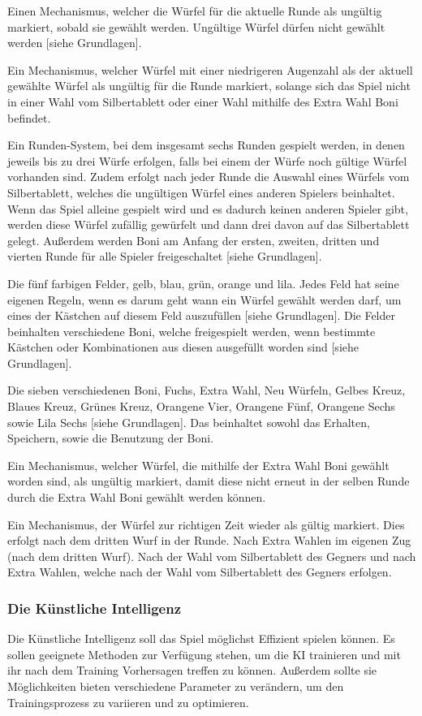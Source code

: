 Einen Mechanismus, welcher die Würfel für die aktuelle Runde als ungültig markiert, sobald sie gewählt werden. Ungültige Würfel dürfen nicht gewählt werden [siehe Grundlagen].

Ein Mechanismus, welcher Würfel mit einer niedrigeren Augenzahl als der aktuell gewählte Würfel als ungültig für die Runde markiert, solange sich das Spiel nicht in einer Wahl vom Silbertablett oder einer Wahl mithilfe des Extra Wahl Boni befindet.

Ein Runden-System, bei dem insgesamt sechs Runden gespielt werden, in denen jeweils bis zu drei Würfe erfolgen, falls bei einem der Würfe noch gültige Würfel vorhanden sind. Zudem erfolgt nach jeder Runde die Auswahl eines Würfels vom Silbertablett, welches die ungültigen Würfel eines anderen Spielers beinhaltet. Wenn das Spiel alleine gespielt wird und es dadurch keinen anderen Spieler gibt, werden diese Würfel zufällig gewürfelt und dann drei davon auf das Silbertablett gelegt. Außerdem werden Boni am Anfang der ersten, zweiten, dritten und vierten Runde für alle Spieler freigeschaltet [siehe Grundlagen].

Die fünf farbigen Felder, gelb, blau, grün, orange und lila. Jedes Feld hat seine eigenen Regeln, wenn es darum geht wann ein Würfel gewählt werden darf, um eines der Kästchen auf diesem Feld auszufüllen [siehe Grundlagen]. Die Felder beinhalten verschiedene Boni, welche freigespielt werden, wenn bestimmte Kästchen oder Kombinationen aus diesen ausgefüllt worden sind [siehe Grundlagen].

Die sieben verschiedenen Boni, Fuchs, Extra Wahl, Neu Würfeln, Gelbes Kreuz, Blaues Kreuz, Grünes Kreuz, Orangene Vier, Orangene Fünf, Orangene Sechs sowie Lila Sechs [siehe Grundlagen]. Das beinhaltet sowohl das Erhalten, Speichern, sowie die Benutzung der Boni.

Ein Mechanismus, welcher Würfel, die mithilfe der Extra Wahl Boni gewählt worden sind, als ungültig markiert, damit diese nicht erneut in der selben Runde durch die Extra Wahl Boni gewählt werden können.

Ein Mechanismus, der Würfel zur richtigen Zeit wieder als gültig markiert. Dies erfolgt nach dem dritten Wurf in der Runde. Nach Extra Wahlen im eigenen Zug (nach dem dritten Wurf). Nach der Wahl vom Silbertablett des Gegners und nach Extra Wahlen, welche nach der Wahl vom Silbertablett des Gegners erfolgen.
\subsubsection{Die Künstliche Intelligenz}
Die Künstliche Intelligenz soll das Spiel möglichst Effizient spielen können. Es sollen geeignete Methoden zur Verfügung stehen, um die KI trainieren und mit ihr nach dem Training Vorhersagen treffen zu können. Außerdem sollte sie Möglichkeiten bieten verschiedene Parameter zu verändern, um den Trainingsprozess zu variieren und zu optimieren. 

